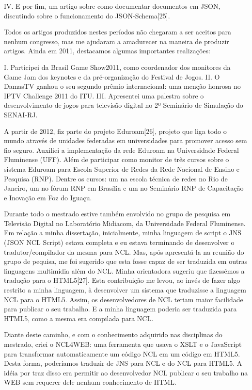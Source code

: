 \documentclass[10pt,a4paper,oneside]{book}
\begin{document}
IV. E por fim, um artigo sobre como documentar documentos em JSON, discutindo sobre o 
funcionamento do JSON-Schema[25].

Todos os artigos produzidos nestes períodos não chegaram a ser aceitos para nenhum congresso, 
mas me ajudaram a amadurecer na maneira de produzir artigos. Ainda em 2011, destacamos algumas 
importantes realizações:

I. Participei da Brasil Game Show2011, como coordenador dos monitores da Game Jam dos keynotes 
e da pré-organização do Festival de Jogos.
II. O DamasTV ganhou o seu segundo prêmio internacional: uma menção honrosa no IPTV Challenge 2011 
do ITU.
III. Apresentei uma palestra sobre o desenvolvimento de jogos para televisão digital no 2º 
Seminário de Simulação do SENAI-RJ.

A partir de 2012, fiz parte do projeto Eduroam[26], projeto que liga todo o mundo através de 
unidades federadas em universidades para promover acesso sem fio seguro. Auxiliei a implementação 
da rede Eduroam na Universidade Federal Fluminense (UFF). Além de participar como monitor de três 
cursos sobre o sistema Eduroam para Escola Superior de Redes da Rede Nacional de Ensino e Pesquisa 
(RNP). Dentre os cursos: um na escola técnica de redes no Rio de Janeiro, um no fórum RNP em Brasília 
e um no Seminário RNP de Capacitação e Inovação em Foz do Iguaçu.

Durante todo o mestrado estive também envolvido no grupo de pesquisa em Televisão Digital no 
Laboratório Midiacom, da Universidade Federal Fluminense.  Em relação a minha dissertação, 
inicialmente, minha linguagem de script o JNS (JSON NCL Script) estava completa e eu estava 
terminando de desenvolver o tradutor/compilador da mesma para NCL. Mas, após apresentá-la na 
reunião do grupo de pequisa, me foi sugerido que esta fosse capaz de ser traduzida em outras 
linguagens multimídia além do NCL. Minha orientadora sugeriu que fizessémos a tradução para o 
HTML5[27]. Esta contribuição me levou, ao invés de fazer algo restrito a minha linguagem, à 
desenvolver um sistema que traduzisse a linguagem NCL para o HTML5. Assim, os desenvolvedores 
de NCL teriam maior facilidade para publicar o seu trabalho. E a minha linguagem poderia ser 
traduzida para HTML5, como a mesma era compilada para NCL.

Diante deste caminho, e com o conhecimento adquirido nas disciplinas do mestrado, criei o NCL4WEB:  
uma ferramenta que usava o XSLT e o JavaScript para transformar automaticamente um código NCL em 
um código em HTML5. Desta forma, poderíamos traduzir de JNS para NCL e do NCL para HTML5. A idéia 
por traz disso era permitir ao desenvolvedor NCL publicar o seu trabalho na WEB sem requerer dele 
nenhum conhecimento de HTML.
\end{document}
